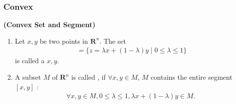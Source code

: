 \documentclass{article}
\newcommand{\bfs}[1]{\textbf{({#1}) }}
\begin{document}
\subsubsection{Convex}\label{sec:conn}
\begin{defa}{\bfs{Convex Set and Segment}}\label{def:con_seg}
 \begin{enumerate}
     \item Let $x, y$ be two points in $\mathbf{R}^{n}$. The set
\begin{align*}
[x, y]=\{z=\lambda x+(1-\lambda) y \mid 0 \leq \lambda \leq 1\}
\end{align*}
is called a  $x, y .$
\item A subset $M$ of $\mathbf{R}^{n}$ is called , if $\forall x, y\in M$, $M$ contains the entire segment $[x, y]$ :
\begin{align*}
\forall x, y \in M, 0 \leq \lambda \leq 1, \lambda x+(1-\lambda) y \in M \text {. }
\end{align*}
 \end{enumerate}
\end{defa}
\end{document}
